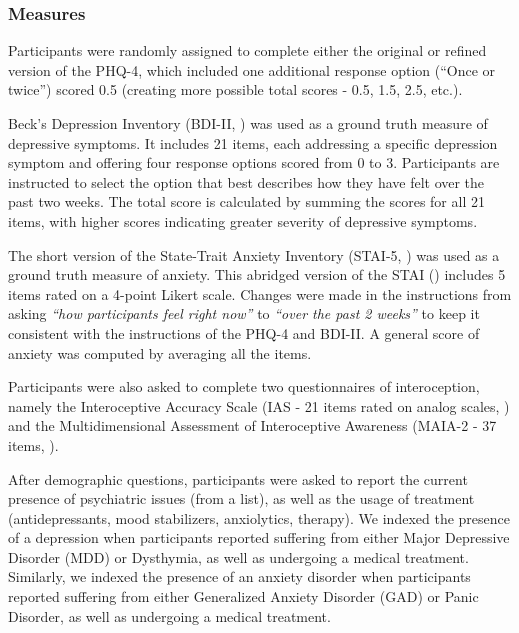 \documentclass[
  jou,
  floatsintext,
  longtable,
  nolmodern,
  notxfonts,
  notimes,
  colorlinks=true,linkcolor=blue,citecolor=blue,urlcolor=blue]{apa7}
\begin{document}
\subsubsection{Measures}\label{measures-1}

Participants were randomly assigned to complete either the original or
refined version of the PHQ-4, which included one additional response
option (``Once or twice'') scored 0.5 (creating more possible total
scores - 0.5, 1.5, 2.5, etc.).

Beck's Depression Inventory (BDI-II, ) was used as a ground truth measure of depressive symptoms.
It includes 21 items, each addressing a specific depression symptom and
offering four response options scored from 0 to 3. Participants are
instructed to select the option that best describes how they have felt
over the past two weeks. The total score is calculated by summing the
scores for all 21 items, with higher scores indicating greater severity
of depressive symptoms.

The short version of the State-Trait Anxiety Inventory (STAI-5,
) was used as a
ground truth measure of anxiety. This abridged version of the STAI
() includes 5
items rated on a 4-point Likert scale. Changes were made in the
instructions from asking \emph{``how participants feel right now''} to
\emph{``over the past 2 weeks''} to keep it consistent with the
instructions of the PHQ-4 and BDI-II. A general score of anxiety was
computed by averaging all the items.

Participants were also asked to complete two questionnaires of
interoception, namely the Interoceptive Accuracy Scale (IAS - 21 items
rated on analog scales, ) and the Multidimensional Assessment of Interoceptive Awareness
(MAIA-2 - 37 items, ).

After demographic questions, participants were asked to report the
current presence of psychiatric issues (from a list), as well as the
usage of treatment (antidepressants, mood stabilizers, anxiolytics,
therapy). We indexed the presence of a depression when participants
reported suffering from either Major Depressive Disorder (MDD) or
Dysthymia, as well as undergoing a medical treatment. Similarly, we
indexed the presence of an anxiety disorder when participants reported
suffering from either Generalized Anxiety Disorder (GAD) or Panic
Disorder, as well as undergoing a medical treatment.
\end{document}
